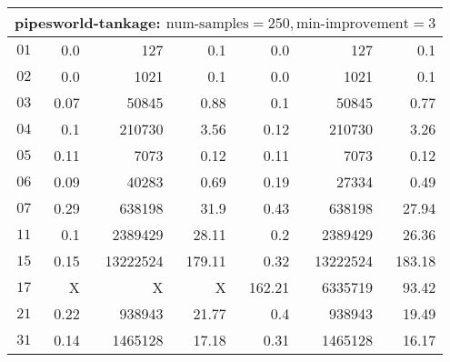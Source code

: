 \begin{longtable}{|c||r|r|r||r|r|r|}
\multicolumn{7}{|l|}{pipesworld-tankage: $\text{num-samples}=250,\text{min-improvement}=3$}\\\hline
$01$ & 0.0 & 127 & 0.1 &0.0 & 127 & 0.1 \\\hline
$02$ & 0.0 & 1021 & 0.1 &0.0 & 1021 & 0.1 \\\hline
$03$ & 0.07 & 50845 & 0.88 &0.1 & 50845 & 0.77 \\\hline
$04$ & 0.1 & 210730 & 3.56 &0.12 & 210730 & 3.26 \\\hline
$05$ & 0.11 & 7073 & 0.12 &0.11 & 7073 & 0.12 \\\hline
$06$ & 0.09 & 40283 & 0.69 &0.19 & 27334 & 0.49 \\\hline
$07$ & 0.29 & 638198 & 31.9 &0.43 & 638198 & 27.94 \\\hline
$11$ & 0.1 & 2389429 & 28.11 &0.2 & 2389429 & 26.36 \\\hline
$15$ & 0.15 & 13222524 & 179.11 &0.32 & 13222524 & 183.18 \\\hline
$17$ & X & X & X &162.21 & 6335719 & 93.42 \\\hline
$21$ & 0.22 & 938943 & 21.77 &0.4 & 938943 & 19.49 \\\hline
$31$ & 0.14 & 1465128 & 17.18 &0.31 & 1465128 & 16.17 \\\hline


\end{longtable}
